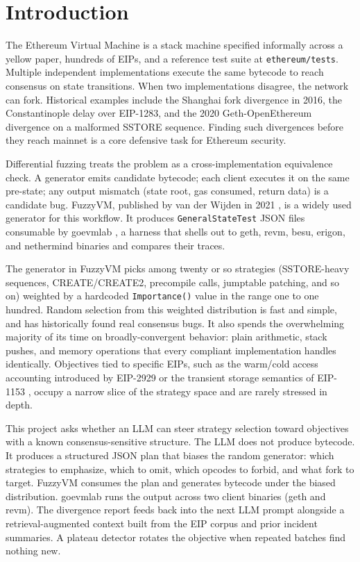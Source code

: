 \documentclass[conference]{IEEEtran}
\begin{document}
\section{Introduction}

The Ethereum Virtual Machine is a stack machine specified informally across a yellow paper, hundreds of EIPs, and a reference test suite at \texttt{ethereum/tests}. Multiple independent implementations execute the same bytecode to reach consensus on state transitions. When two implementations disagree, the network can fork. Historical examples include the Shanghai fork divergence in 2016, the Constantinople delay over EIP-1283, and the 2020 Geth-OpenEthereum divergence on a malformed SSTORE sequence. Finding such divergences before they reach mainnet is a core defensive task for Ethereum security.

Differential fuzzing treats the problem as a cross-implementation equivalence check. A generator emits candidate bytecode; each client executes it on the same pre-state; any output mismatch (state root, gas consumed, return data) is a candidate bug. FuzzyVM, published by van der Wijden in 2021 \cite{fuzzyvm}, is a widely used generator for this workflow. It produces \texttt{GeneralStateTest} JSON files consumable by goevmlab \cite{goevmlab}, a harness that shells out to geth, revm, besu, erigon, and nethermind binaries and compares their traces.

The generator in FuzzyVM picks among twenty or so strategies (SSTORE-heavy sequences, CREATE/CREATE2, precompile calls, jumptable patching, and so on) weighted by a hardcoded \texttt{Importance()} value in the range one to one hundred. Random selection from this weighted distribution is fast and simple, and has historically found real consensus bugs. It also spends the overwhelming majority of its time on broadly-convergent behavior: plain arithmetic, stack pushes, and memory operations that every compliant implementation handles identically. Objectives tied to specific EIPs, such as the warm/cold access accounting introduced by EIP-2929 \cite{eip2929} or the transient storage semantics of EIP-1153 \cite{eip1153}, occupy a narrow slice of the strategy space and are rarely stressed in depth.

This project asks whether an LLM can steer strategy selection toward objectives with a known consensus-sensitive structure. The LLM does not produce bytecode. It produces a structured JSON plan that biases the random generator: which strategies to emphasize, which to omit, which opcodes to forbid, and what fork to target. FuzzyVM consumes the plan and generates bytecode under the biased distribution. goevmlab runs the output across two client binaries (geth and revm). The divergence report feeds back into the next LLM prompt alongside a retrieval-augmented context built from the EIP corpus and prior incident summaries. A plateau detector rotates the objective when repeated batches find nothing new.
\end{document}
